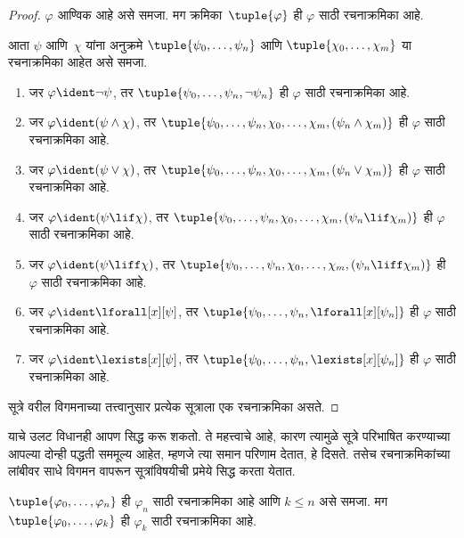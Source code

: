 \begin{proof}
$\varphi$ आण्विक आहे असे समजा. मग क्रमिका~$\tuple{\varphi}$ ही $\varphi$ साठी
रचनाक्रमिका आहे.

आता $\psi$ आणि~$\chi$ यांना अनुक्रमे $\tuple{\psi_0,\dotsc,\psi_n}$ आणि
$\tuple{\chi_0,\dotsc,\chi_m}$ या रचनाक्रमिका आहेत असे समजा.

\begin{enumerate}
  \item जर $\varphi \ident \lnot \psi$, तर
      $\tuple{\psi_0,\dotsc,\psi_n,\lnot \psi_n}$ ही $\varphi$ साठी
      रचनाक्रमिका आहे.
  \item जर $\varphi \ident (\psi \land \chi)$, तर
      $\tuple{\psi_0,\dotsc,\psi_n,\chi_0,\dotsc,\chi_m,(\psi_n \land \chi_m)}$
      ही $\varphi$ साठी रचनाक्रमिका आहे.
  \item जर $\varphi \ident (\psi \lor \chi)$, तर
      $\tuple{\psi_0,\dotsc,\psi_n,\chi_0,\dotsc,\chi_m,(\psi_n \lor \chi_m)}$
      ही $\varphi$ साठी रचनाक्रमिका आहे.
  \item जर $\varphi \ident (\psi \lif \chi)$, तर
      $\tuple{\psi_0,\dotsc,\psi_n,\chi_0,\dotsc,\chi_m,(\psi_n \lif \chi_m)}$
      ही $\varphi$ साठी रचनाक्रमिका आहे.
  \item जर $\varphi \ident (\psi \liff \chi)$, तर
      $\tuple{\psi_0,\dotsc,\psi_n,\chi_0,\dotsc,\chi_m,(\psi_n \liff \chi_m)}$
      ही $\varphi$ साठी रचनाक्रमिका आहे.
  \item जर $\varphi \ident \lforall[x][\psi]$, तर
      $\tuple{\psi_0,\dotsc,\psi_n,\lforall[x][\psi_n]}$
      ही $\varphi$ साठी रचनाक्रमिका आहे.
  \item जर $\varphi \ident \lexists[x][\psi]$, तर
      $\tuple{\psi_0,\dotsc,\psi_n,\lexists[x][\psi_n]}$
      ही $\varphi$ साठी रचनाक्रमिका आहे.
\end{enumerate}
सूत्रे वरील विगमनाच्या तत्त्वानुसार प्रत्येक सूत्राला एक
रचनाक्रमिका असते.
\end{proof}

याचे उलट विधानही आपण सिद्ध करू शकतो. ते महत्त्वाचे आहे, कारण त्यामुळे
सूत्रे परिभाषित करण्याच्या आपल्या दोन्ही पद्धती सममूल्य आहेत, म्हणजे
त्या समान परिणाम देतात, हे दिसते. तसेच रचनाक्रमिकांच्या लांबीवर साधे
विगमन वापरून सूत्रांविषयीची प्रमेये सिद्ध करता येतात.

\begin{lem}
\label{fol:syn:fseq:lem:fseq-init}
$\tuple{\varphi_0,\dotsc,\varphi_n}$ ही $\varphi_n$ साठी रचनाक्रमिका आहे आणि
$k \leq n$ असे समजा. मग $\tuple{\varphi_0,\dotsc,\varphi_k}$ ही $\varphi_k$ साठी
रचनाक्रमिका आहे.
\end{lem}

